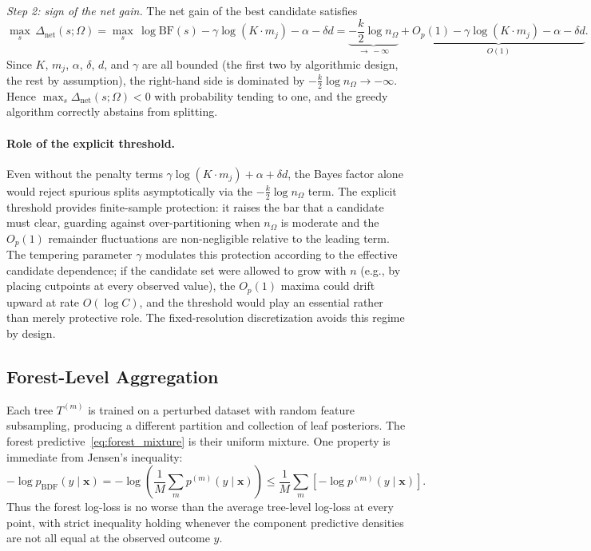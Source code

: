 \documentclass[twoside,11pt]{article}
\begin{document}
\emph{Step 2: sign of the net gain.}
The net gain of the best candidate satisfies
\[
\max_{s}\,\Delta_{\mathrm{net}}(s;\Omega)
= \max_{s}\,\log\mathrm{BF}(s) - \gamma\log(K \cdot m_j) - \alpha - \delta d
= \underbrace{-\frac{k}{2}\log n_\Omega}_{\to\,-\infty} + \underbrace{O_p(1) - \gamma\log(K \cdot m_j) - \alpha - \delta d}_{O(1)}.
\]
Since $K$, $m_j$, $\alpha$, $\delta$, $d$, and $\gamma$ are all bounded (the first two by algorithmic design, the rest by assumption), the right-hand side is dominated by $-\frac{k}{2}\log n_\Omega \to -\infty$. Hence $\max_s \Delta_{\mathrm{net}}(s;\Omega) < 0$ with probability tending to one, and the greedy algorithm correctly abstains from splitting.

\paragraph{Role of the explicit threshold.}
Even without the penalty terms $\gamma\log(K \cdot m_j) + \alpha + \delta d$, the Bayes factor alone would reject spurious splits asymptotically via the $-\frac{k}{2}\log n_\Omega$ term. The explicit threshold provides finite-sample protection: it raises the bar that a candidate must clear, guarding against over-partitioning when $n_\Omega$ is moderate and the $O_p(1)$ remainder fluctuations are non-negligible relative to the leading term. The tempering parameter $\gamma$ modulates this protection according to the effective candidate dependence; if the candidate set were allowed to grow with $n$ (e.g., by placing cutpoints at every observed value), the $O_p(1)$ maxima could drift upward at rate $O(\log C)$, and the threshold would play an essential rather than merely protective role. The fixed-resolution discretization avoids this regime by design.


\subsection{Forest-Level Aggregation}\label{subsec:theory_forest}

Each tree $T^{(m)}$ is trained on a perturbed dataset with random feature subsampling, producing a different partition and collection of leaf posteriors. The forest predictive~\eqref{eq:forest_mixture} is their uniform mixture. One property is immediate from Jensen's inequality:
\begin{equation}\label{eq:mixture_jensen}
-\log p_{\mathrm{BDF}}(y \mid \mathbf{x})
= -\log\!\left(\frac{1}{M}\sum_m p^{(m)}(y \mid \mathbf{x})\right)
\le \frac{1}{M}\sum_m \left[-\log p^{(m)}(y \mid \mathbf{x})\right].
\end{equation}
Thus the forest log-loss is no worse than the average tree-level log-loss at every point, with strict inequality holding whenever the component predictive densities are not all equal at the observed outcome $y$.
\end{document}
